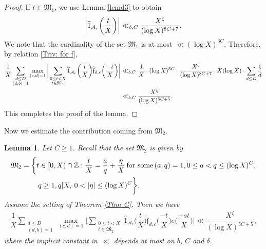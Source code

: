 \documentclass[12pt]{amsart}
\numberwithin{equation}{section}
\newtheorem{lemma}[theorem]{Lemma}
\theoremstyle{remark}
\theoremstyle{definition}
\begin{document}
\begin{proof}
If $t\in \mathfrak{M}_1$, we use Lemma \ref{lemd3} to obtain
\begin{align}
\notag \bigg\lvert \widehat{1}_{\mathcal{A}_r}\bigg(\dfrac{t}{X}\bigg)\bigg\rvert \ll_{b, C} \dfrac{X^{\zeta}}{(\log X)^{8C+7}}.
\end{align}
We note that the cardinality of the set $\mathfrak{M}_1$ is at most $\ll (\log X)^{3C}$. Therefore, by relation \eqref{Triv: for f},
\begin{align}
\notag \dfrac{1}{X}\sum_{\substack{d \leq D\\(d,b)=1}}\max_{(c,d)=1}\bigg\lvert
\sum_{\substack{0\leq t<X\\t\in \mathfrak{M}_1}}\widehat{1}_{\mathcal{A}_r}\bigg(\dfrac{t}{X}\bigg)\widehat{\mathfrak{f}}_{d, c}\bigg(\dfrac{-t}{X}\bigg)\bigg\rvert & \ll_{b, C} \dfrac{1}{X}\cdot (\log X)^{3C}\cdot \dfrac{X^{\zeta}}{(\log X)^{8C+7}}\cdot X(\log X)\cdot\sum_{d\leq D}\dfrac{1}{d}\\
\notag & \ll_{b, C} \dfrac{X^{\zeta}}{(\log X)^{5C+5}}.
\end{align}
This completes the proof of the lemma.
\end{proof}


Now we estimate the contribution coming from $\mathfrak{M}_2$.

\begin{lemma}\label{Majorarc2}
Let $C\geq 1$. Recall that the set $\mathfrak{M}_2$ is given by
\begin{align}
\notag \mathfrak{M}_2 =\bigg\{&t \in [0, X)\cap \mathbb{Z}: \dfrac{t}{X}=\dfrac{a}{q}+ \dfrac{\eta}{X}\: \text{for some}\, (a, q)=1, 0\leq a <q\leq (\log X)^C,\\
\notag & \: q\geq 1, q\vert X,\: 0<\lvert \eta \rvert \leq (\log X)^C\bigg\}.
\end{align}
Assume the setting of Theorem \ref{Thm G}. Then we have
\begin{align}\label{Majorarceq2}
\dfrac{1}{X}\sum_{\substack{d\leq D\\(d, b)=1}}\max_{(c,d)=1}\bigg\lvert
\sum_{\substack{0\leq t<X\\t\in \mathfrak{M}_2}}\widehat{1}_{\mathcal{A}_r}\bigg(\dfrac{t}{X}\bigg)\widehat{\mathfrak{f}}_{d,c}\bigg(\dfrac{-t}{X}\bigg)e\bigg(\dfrac{-st}{X}\bigg)\bigg\rvert \ll\dfrac{X^{\zeta}}{(\log X)^{5C+5}},
\end{align}
where the implicit constant in $\ll$ depends at most on $b$, $C$ and $\delta$.
\end{lemma}
\end{document}

